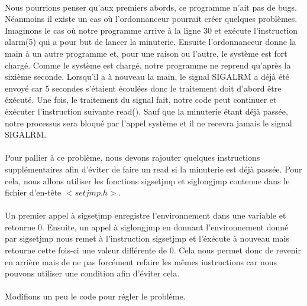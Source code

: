\documentclass{article}
\begin{document}


\paragraph{} Nous pourrions penser qu'aux premiers abords, ce programme n'ait pas de bugs. Néanmoins il existe un cas où l'ordonnanceur pourrait créer quelques problèmes.
Imaginons le cas où notre programme arrive à la ligne 30 et exécute l'instruction alarm(5) qui a pour but de lancer la minuterie. 
Ensuite l'ordonnanceur donne la main à un autre programme et, pour une raison ou l'autre, le système est fort chargé. Comme le système est chargé, notre programme ne reprend 
qu'après la sixième seconde. Lorsqu'il a à nouveau la main, le signal SIGALRM a déjà été envoyé car 5 secondes s'étaient écoulées donc le traitement doit d'abord être éxécuté.
Une fois, le traitement du signal fait, notre code peut continuer et éxécuter l'instruction suivante read(). Sauf que la minuterie étant déjà passée, notre processus sera bloqué 
par l'appel système et il ne recevra jamais le signal SIGALRM.

\paragraph{} Pour pallier à ce problème, nous devons rajouter quelques instructions supplémentaires afin d'éviter de faire un read si la minuterie est déjà passée.
Pour cela, nous allons utiliser les fonctions sigsetjmp et siglongjmp contenue dans le fichier d'en-tête $<setjmp.h>$. 

\paragraph{} Un premier appel à sigsetjmp enregistre l'environnement dans une variable et retourne 0. Ensuite, un appel à siglongjmp en donnant l'environnement donné par sigsetjmp
nous remet à l'instruction sigsetjmp et l'éxécute à nouveau mais retourne cette fois-ci une valeur différente de 0. Cela nous permet donc de revenir en arrière 
mais de ne pas forcément refaire les mêmes instructions car nous pouvons utiliser une condition afin d'éviter cela.

\paragraph{} Modifions un peu le code pour régler le problème.


\end{document}

